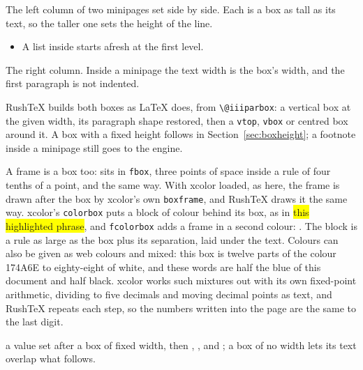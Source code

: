 \documentclass{article}
\numberwithin{equation}{section}
\theoremstyle{definition}
\theoremstyle{remark}
\begin{document}
\noindent\begin{minipage}[t]{0.47\textwidth}
The left column of two minipages set side by side. Each is a box as tall as its text,
so the taller one sets the height of the line.

\begin{itemize}
\item A list inside starts afresh at the first level.
\end{itemize}
\end{minipage}\hfill
\begin{minipage}[t]{0.47\textwidth}
The right column. Inside a minipage the text width is the box's width, and the first
paragraph is not indented.
\end{minipage}

RushTeX builds both boxes as \LaTeX{} does, from \texttt{\textbackslash @iiiparbox}: a
vertical box at the given width, its paragraph shape restored, then a \texttt{vtop},
\texttt{vbox} or centred box around it. A box with a fixed height follows in
Section~\ref{sec:boxheight}; a footnote inside a minipage still goes to the engine.

A frame is a box too:  sits in \texttt{fbox}, three points of space
inside a rule of four tenths of a point, and  the same way. With xcolor loaded, as here, the frame is
drawn after the box by xcolor's own \texttt{boxframe}, and RushTeX draws it the same
way.
xcolor's \texttt{colorbox} puts a block of colour behind its box, as in
\colorbox{yellow}{this highlighted phrase}, and \texttt{fcolorbox} adds a frame in a
second colour: . The block is a rule as large
as the box plus its separation, laid under the text.
Colours can also be given as web colours and mixed: \colorbox{rtdeep!12}{this box} is
twelve parts of the colour \textcolor{rtdeep}{174A6E} to eighty-eight of white, and
\textcolor{rtblue!50!black}{these words} are half the blue of this document and half
black. xcolor works such mixtures out with its own fixed-point arithmetic, dividing to
five decimals and moving decimal points as text, and RushTeX repeats each step, so the
numbers written into the page are the same to the last digit.

\noindent{}a value set after a box of fixed width, then
, , 
and ; a box of no width lets its text overlap what follows.
\end{document}
